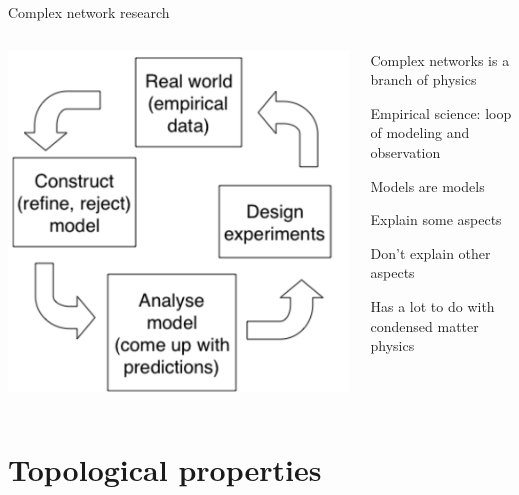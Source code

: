 \begin{frame}{Complex network research}

\begin{columns}
\begin{column}{0.4\textwidth}
\includegraphics[width=\textwidth]{experimental}
\end{column}
\begin{column}{0.6\textwidth}
\BIL
\item Complex networks is a branch of physics
\item Empirical science: loop of modeling and observation
\item Models are models
\BI
\item Explain some aspects
\item Don't explain other aspects
\EI
\item Has a lot to do with condensed matter physics
\EIL
\end{column}
\end{columns}


\end{frame}

\section{Topological properties}

